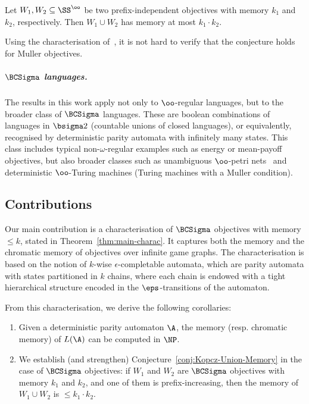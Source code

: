 \begin{conjecture}\label{conj:Kopcz-Union-Memory}
	Let $W_1,W_2\subseteq \SS^\oo$ be two prefix-independent objectives with memory $k_1$ and $k_2$, respectively. Then $W_1\cup W_2$ has memory at most $k_1 \cdot k_2$.
\end{conjecture}

Using the characterisation of~\cite{DJW1997memory}, it is not hard to verify that the conjecture holds for Muller objectives.

\subparagraph*{$\BCSigma$ languages.}

The results in this work apply not only to $\oo$-regular languages, but to the broader class of $\BCSigma$ languages.
These are boolean combinations of languages in $\bsigma 2$ (countable unions of closed languages), or equivalently, recognised by deterministic parity automata with infinitely many states.
This class includes typical non-$\omega$-regular examples such as energy or mean-payoff objectives, but also broader classes such as unambiguous $\oo$-petri nets~\cite{FSJLS22} and deterministic $\oo$-Turing machines (Turing machines with a Muller condition).


\subsection*{Contributions}

Our main contribution is a characterisation of $\BCSigma$ objectives with memory $\leq k$, stated in Theorem~\ref{thm:main-charac}.
It captures both the memory and the chromatic memory of objectives over infinite game graphs.
The characterisation is based on the notion of $k$-wise $\epsilon$-completable automata, which are parity automata with states partitioned in $k$ chains, where each chain is endowed with a tight hierarchical structure encoded in the $\eps$-transitions of the automaton.

From this characterisation, we derive the following corollaries:
\begin{enumerate}
	\item {} Given a deterministic parity automaton $\A$, the memory (resp. chromatic memory) of $L(\A)$  can be computed in $\NP$.%
	

	\item {} We establish (and strengthen) Conjecture~\ref{conj:Kopcz-Union-Memory} in the case of $\BCSigma$ objectives: if $W_1$ and $W_2$ are $\BCSigma$ objectives with memory $k_1$ and
	 $k_2$, and one of them is prefix-increasing, then the memory of $W_1 \cup W_2$ is $\leq k_1\cdot k_2$.%
\end{enumerate}


